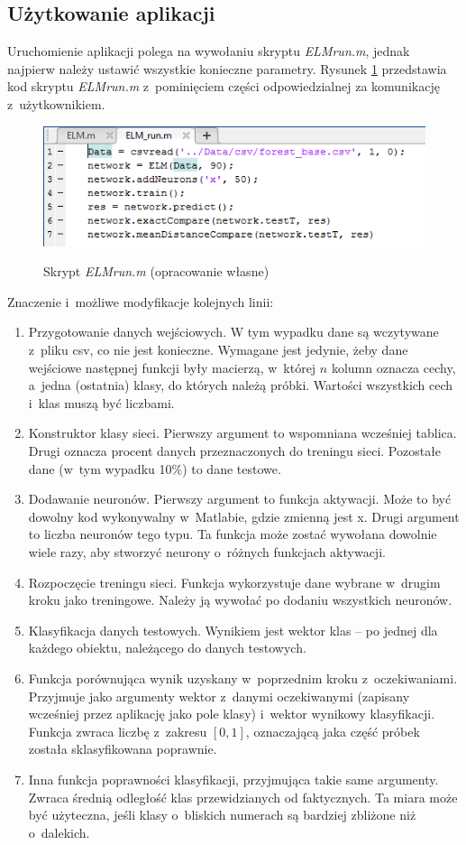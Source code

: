 \documentclass[pl]{minipw} %
\begin{document}
\subsection*{Użytkowanie aplikacji}
Uruchomienie aplikacji polega na wywołaniu skryptu \textit{ELM\textunderscore run.m}, jednak najpierw należy ustawić wszystkie konieczne parametry. Rysunek \ref{elm_run} przedstawia kod skryptu \textit{ELM\textunderscore run.m} z~pominięciem części odpowiedzialnej za komunikację z~użytkownikiem.
\begin{figure}[H]
\centering
\includegraphics[width=1\textwidth]{elm_run.png}
\label{elm_run}
\caption[Skrypt \textit{ELM\textunderscore run.m}]{Skrypt \textit{ELM\textunderscore run.m} (opracowanie własne)}
\end{figure}
Znaczenie i~możliwe modyfikacje kolejnych linii:
\begin{enumerate}
\item Przygotowanie danych wejściowych.
W tym wypadku dane są wczytywane z~pliku csv, co nie jest konieczne.
Wymagane jest jedynie, żeby dane wejściowe następnej funkcji były macierzą, w~której $n$ kolumn oznacza cechy, a~jedna (ostatnia) klasy, do których należą próbki. Wartości wszystkich cech i~klas muszą być liczbami.
\item Konstruktor klasy sieci. 
Pierwszy argument to wspomniana wcześniej tablica. 
Drugi oznacza procent danych przeznaczonych do treningu sieci.
Pozostałe dane (w~tym wypadku 10\%) to dane testowe.
\item Dodawanie neuronów.
Pierwszy argument to funkcja aktywacji.
Może to być dowolny kod wykonywalny w~Matlabie, gdzie zmienną jest x.
Drugi argument to liczba neuronów tego typu.
Ta funkcja może zostać wywołana dowolnie wiele razy, aby stworzyć neurony o~różnych funkcjach aktywacji.
\item Rozpoczęcie treningu sieci. 
Funkcja wykorzystuje dane wybrane w~drugim kroku jako treningowe.
Należy ją wywołać po dodaniu wszystkich neuronów.
\item Klasyfikacja danych testowych.
Wynikiem jest wektor klas -- po jednej dla każdego obiektu, należącego do danych testowych.
\item Funkcja porównująca wynik uzyskany w~poprzednim kroku z~oczekiwaniami.
Przyjmuje jako argumenty wektor z~danymi oczekiwanymi (zapisany wcześniej przez aplikację jako pole klasy) i~wektor wynikowy klasyfikacji.
Funkcja zwraca liczbę z~zakresu $[0, 1]$, oznaczającą jaka część próbek została sklasyfikowana poprawnie.
\item Inna funkcja poprawności klasyfikacji, przyjmująca takie same argumenty.
Zwraca średnią odległość klas przewidzianych od faktycznych.
Ta miara może być użyteczna, jeśli klasy o~bliskich numerach są bardziej zbliżone niż o~dalekich.
\end{enumerate}
\end{document}
